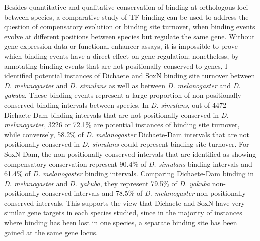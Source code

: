 Besides quantitative and qualitative conservation of binding at orthologous loci between species, a comparative study of TF binding can be used to address the question of compensatory evolution or binding site turnover, when binding events evolve at different positions between species but regulate the same gene. Without gene expression data or functional enhancer assays, it is impossible to prove which binding events have a direct effect on gene regulation; nonetheless, by annotating binding events that are not positionally conserved to genes, I identified potential instances of Dichaete and SoxN binding site turnover between \emph{D. melanogaster} and \emph{D. simulans} as well as between \emph{D. melanogaster} and \emph{D. yakuba}. These binding events represent a large proportion of non-positionally conserved binding intervals between species. In \emph{D. simulans}, out of 4472 Dichaete-Dam binding intervals that are not positionally conserved in \emph{D. melanogaster}, 3226 or 72.1\% are potential instances of binding site turnover, while conversely, 58.2\% of \emph{D. melanogaster} Dichaete-Dam intervals that are not positionally conserved in \emph{D. simulans} could represent binding site turnover. For SoxN-Dam, the non-positionally conserved intervals that are identified as showing compensatory conservation represent 90.4\% of \emph{D. simulans} binding intervals and 61.4\% of \emph{D. melanogaster} binding intervals. Comparing Dichaete-Dam binding in \emph{D. melanogaster} and \emph{D. yakuba}, they represent 79.5\% of \emph{D. yakuba} non-positionally conserved intervals and 78.5\% of \emph{D. melanogaster} non-positionally conserved intervals. This supports the view that Dichaete and SoxN have very similar gene targets in each species studied, since in the majority of instances where binding has been lost in one species, a separate binding site has been gained at the same gene locus.\\

